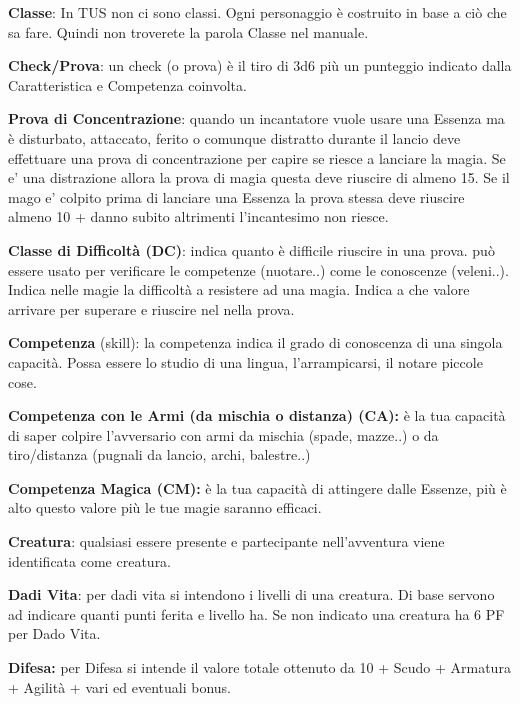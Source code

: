 \documentclass[a4paper,11pt,twoside,openany]{book}
\begin{document}
\textbf{Classe}: In TUS non ci sono classi. Ogni personaggio è costruito in base a ciò che sa fare. Quindi non troverete la parola Classe nel manuale.

\textbf{Check/Prova}: un check (o prova) è il tiro di 3d6 più un punteggio indicato dalla Caratteristica e Competenza coinvolta.

\textbf{Prova di Concentrazione}: quando un incantatore vuole usare una Essenza ma è disturbato, attaccato, ferito o comunque distratto durante il lancio deve effettuare una prova di concentrazione per capire se riesce a lanciare la magia.
Se e' una distrazione allora la prova di magia questa deve riuscire di almeno 15.
Se il mago e' colpito prima di lanciare una Essenza la prova stessa deve riuscire almeno 10 + danno subito altrimenti l'incantesimo non riesce.

\textbf{Classe di Difficoltà (DC)}: indica quanto è difficile riuscire in una prova. può essere usato per verificare le competenze (nuotare..) come le conoscenze (veleni..). Indica nelle magie la difficoltà a resistere ad una magia. Indica a che valore arrivare per superare e riuscire nel nella prova.

\textbf{Competenza} (skill): la competenza indica il grado di conoscenza di una singola capacità. Possa essere lo studio di una lingua, l'arrampicarsi, il notare piccole cose.

\textbf{Competenza con le Armi (da mischia o distanza) (CA):} è la tua capacità di saper colpire l'avversario con armi da mischia (spade, mazze..) o da tiro/distanza (pugnali da lancio, archi, balestre..)

\textbf{Competenza Magica (CM):} è la tua capacità di attingere dalle Essenze, più è alto questo valore più le tue magie saranno efficaci.

\textbf{Creatura}: qualsiasi essere presente e partecipante nell'avventura viene identificata come creatura.

\textbf{Dadi Vita}: per dadi vita si intendono i livelli di una creatura. Di base servono ad indicare quanti punti ferita e livello ha. Se non indicato una creatura ha 6 PF per Dado Vita.

\textbf{Difesa:} per Difesa si intende il valore totale ottenuto da 10 + Scudo + Armatura + Agilità + vari ed eventuali bonus.
\end{document}
